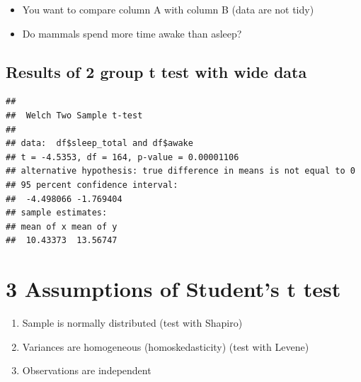\documentclass[
]{book}
\newenvironment{Shaded}{\begin{snugshade}}{\end{snugshade}}
\newcommand{\DataTypeTok}[1]{\textcolor[rgb]{0.13,0.29,0.53}{#1}}
\newcommand{\KeywordTok}[1]{\textcolor[rgb]{0.13,0.29,0.53}{\textbf{#1}}}
\newcommand{\NormalTok}[1]{#1}
\newcommand{\OperatorTok}[1]{\textcolor[rgb]{0.81,0.36,0.00}{\textbf{#1}}}
\providecommand{\tightlist}{%
  \setlength{\itemsep}{0pt}\setlength{\parskip}{0pt}}
\begin{document}
\begin{itemize}
\tightlist
\item
  You want to compare column A with column B (data are not tidy)
\item
  Do mammals spend more time awake than asleep?
\end{itemize}

\begin{Shaded}
\end{Shaded}

\hypertarget{results-of-2-group-t-test-with-wide-data}{%
\subsection{Results of 2 group t test with wide data}\label{results-of-2-group-t-test-with-wide-data}}

\begin{Shaded}
\end{Shaded}

\begin{verbatim}
## 
##  Welch Two Sample t-test
## 
## data:  df$sleep_total and df$awake
## t = -4.5353, df = 164, p-value = 0.00001106
## alternative hypothesis: true difference in means is not equal to 0
## 95 percent confidence interval:
##  -4.498066 -1.769404
## sample estimates:
## mean of x mean of y 
##  10.43373  13.56747
\end{verbatim}

\hypertarget{assumptions-of-students-t-test}{%
\section{3 Assumptions of Student's t test}\label{assumptions-of-students-t-test}}

\begin{enumerate}
\def\labelenumi{\arabic{enumi}.}
\tightlist
\item
  Sample is normally distributed (test with Shapiro)
\item
  Variances are homogeneous (homoskedasticity) (test with Levene)
\item
  Observations are independent
\end{enumerate}
\end{document}

